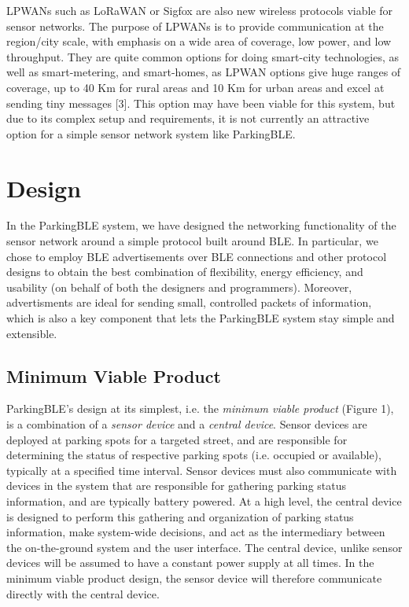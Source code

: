 \documentclass[sigconf]{acmart}
\begin{document}
LPWANs such as LoRaWAN or Sigfox are also new wireless protocols viable for sensor networks. The purpose of LPWANs is
to provide communication at the region/city scale, with emphasis on a wide area of coverage, low power,
and low throughput. They are quite common options for doing smart-city technologies, as well as smart-metering,
and smart-homes, as LPWAN options give huge ranges of coverage, up to 40 Km for rural areas and 10 Km for urban
areas and excel at sending tiny messages [3]. This option may have been viable for this system, but due to its complex
setup and requirements, it is not currently an attractive option for a simple sensor network system
like ParkingBLE.

\section{Design}
In the ParkingBLE system, we have designed the networking functionality
of the sensor network around a simple protocol built around BLE. In particular,
we chose to employ BLE advertisements over BLE connections and other
protocol designs to obtain the best combination of flexibility, energy
efficiency, and usability (on behalf of both the designers and programmers).
Moreover, advertisments are ideal for sending small, controlled packets
of information, which is also a key component that lets the ParkingBLE
system stay simple and extensible.

\subsection{Minimum Viable Product}
ParkingBLE's design at its simplest, i.e. the \textit{minimum viable product}
(Figure 1), is a combination of a \textit{sensor device} and a \textit{central device}.
Sensor devices are deployed at parking spots for a targeted street, and are responsible
for determining the status of respective parking spots (i.e. occupied or available),
typically at a specified time interval. Sensor devices must also communicate with
devices in the system that are responsible for gathering parking status information,
and are typically battery powered.
At a high level, the central device is designed to perform this gathering and organization
of parking status information, make system-wide decisions, and act as the intermediary
between the on-the-ground system and the user interface. The central device, unlike
sensor devices will be assumed to have a constant power supply at all times. In the
minimum viable product design, the sensor device will therefore communicate directly
with the central device. \newline
\end{document}

